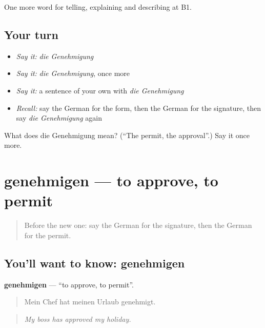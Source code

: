 \begin{grammarlens}[title={What you've built}]
One more word for telling, explaining and describing at B1.
\end{grammarlens}

\subsection*{Your turn}
\begin{itemize}
\raggedright
  \item \emph{Say it:} \emph{die Genehmigung}
  \item \emph{Say it:} \emph{die Genehmigung}, once more
  \item \emph{Say it:} a sentence of your own with \emph{die Genehmigung}
  \item \emph{Recall:} say the German for the form, then the German for the signature, then say \emph{die Genehmigung} again
\end{itemize}

\begin{tcolorbox}[breakable,colback=teal!4,colframe=teal!35!black,title={Before you move on}]
What does die Genehmigung mean? (\textquotedblleft{}The permit, the approval\textquotedblright{}.) Say it once more.
\end{tcolorbox}
\section[genehmigen]{genehmigen — to approve, to permit}

\label{lesson:GE-C384-genehmigen}



\begin{quote}
Before the new one: say the German for the signature, then the German for the permit.
\end{quote}

\subsection*{You'll want to know: genehmigen}
\textbf{genehmigen} — \textquotedblleft{}to approve, to permit\textquotedblright{}.

\begin{quote}
Mein Chef hat meinen Urlaub genehmigt.
\end{quote}

\begin{quote}
\emph{My boss has approved my holiday.}
\end{quote}

